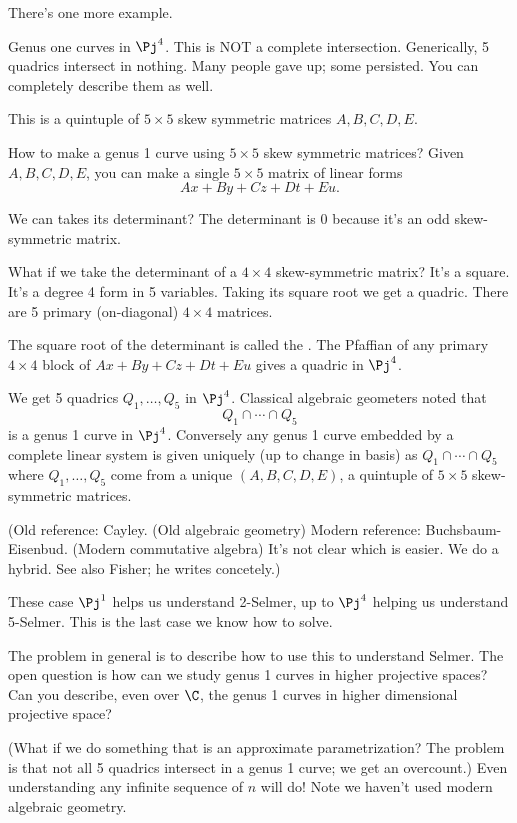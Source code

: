 There's one more example.
\begin{ex}[Example 5]
Genus one curves in $\Pj^4$. This is NOT a complete intersection. Generically, 5 quadrics intersect in nothing. Many people gave up; some persisted. You can completely describe them as well. 

This is a quintuple of $5\times 5$ skew symmetric matrices $A,B,C,D,E$. 

How to make a genus 1 curve using $5\times 5$ skew symmetric matrices? Given $A,B,C,D,E$, you can make a single $5\times 5$ matrix of linear forms
\[
Ax+By+Cz + Dt+ Eu.
\]

We can takes its determinant? The determinant is 0 because it's an odd skew-symmetric matrix.

What if we take the determinant of a $4\times 4$ skew-symmetric matrix? It's a square. It's a degree 4 form in 5 variables. Taking its square root we get a quadric. There are 5 primary (on-diagonal) $4\times 4$ matrices. 

The square root of the determinant is called the . The Pfaffian of any primary $4\times 4$ block of $Ax+By+Cz + Dt+ Eu$ gives a quadric in $\Pj^4$.

We get 5 quadrics $Q_1,\ldots, Q_5$ in $\Pj^4$. %
Classical algebraic geometers noted that 
\[
Q_1\cap \cdots \cap Q_5
\]
is a genus 1 curve in $\Pj^4$. Conversely any genus 1 curve embedded by a complete linear system is given uniquely (up to change in basis) as $Q_1\cap \cdots \cap Q_5$ where $Q_1,\ldots, Q_5$ come from a unique $(A,B,C,D,E)$, a quintuple of $5\times 5$ skew-symmetric matrices.

(Old reference: Cayley. (Old algebraic geometry) Modern reference: Buchsbaum-Eisenbud. (Modern commutative algebra) It's not clear which is easier. We do a hybrid. See also Fisher; he writes concetely.)
\end{ex}
These case $\Pj^1$ helps us understand 2-Selmer, up to $\Pj^4$ helping us understand 5-Selmer. This is the last case we know how to solve.

The problem in general is to describe how to use this to understand Selmer. The open question is how can we study genus 1 curves in higher projective spaces? 
Can you describe, even over $\C$, the genus 1 curves in higher dimensional projective space?

(What if we do something that is an approximate parametrization? The problem is that not all 5 quadrics intersect in a genus 1 curve; we get an overcount.)
Even understanding any infinite sequence of $n$ will do! Note we haven't used modern algebraic geometry.